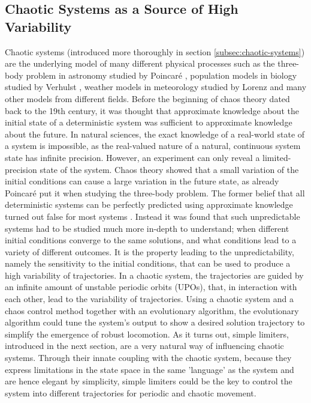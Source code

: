 \documentclass[main]{subfiles}
\begin{document}
\subsection{Chaotic Systems as a Source of High Variability}

Chaotic systems (introduced more thoroughly in section \ref{subsec:chaotic-systems}) are the underlying model of many different physical processes such as the three-body problem in astronomy studied by Poincaré \cite{bib:Poincare1892}, population models in biology studied by Verhulst \cite{bib:Verhulst1838}, weather models in meteorology studied by Lorenz \cite{bib:Lorenz1963} and many other models from different fields. %
%
Before the beginning of chaos theory dated back to the 19th century, it was thought that approximate knowledge about the initial state of a deterministic system was sufficient to approximate knowledge about the future. %
%
In natural sciences, the exact knowledge of a real-world state of a system is impossible, as the real-valued nature of a natural, continuous system state has infinite precision. %
%
However, an experiment can only reveal a limited-precision state of the system. %
%
Chaos theory showed that a small variation of the initial conditions can cause a large variation in the future state, as already Poincaré put it when studying the three-body problem. %
%
The former belief that all deterministic systems can be perfectly predicted using approximate knowledge turned out false for most systems \cite{bib:Motter2013}. %
%
Instead it was found that such unpredictable systems had to be studied much more in-depth to understand; when different initial conditions converge to the same solutions, and what conditions lead to a variety of different outcomes. %
%
It is the property leading to the unpredictability, namely the sensitivity to the initial conditions, that can be used to produce a high variability of trajectories. %
%
In a chaotic system, the trajectories are guided by an infinite amount of unstable periodic orbits (UPOs), that, in interaction with each other, lead to the variability of trajectories. %
%
Using a chaotic system and a chaos control method together with an evolutionary algorithm, the evolutionary algorithm could tune the system's output to show a desired solution trajectory to simplify the emergence of robust locomotion. %
%
As it turns out, simple limiters, introduced in the next section, are a very natural way of influencing chaotic systems. %
%
Through their innate coupling with the chaotic system, because they express limitations in the state space in the same 'language' as the system and are hence elegant by simplicity, simple limiters could be the key to control the system into different trajectories for periodic and chaotic movement. %
\end{document}
